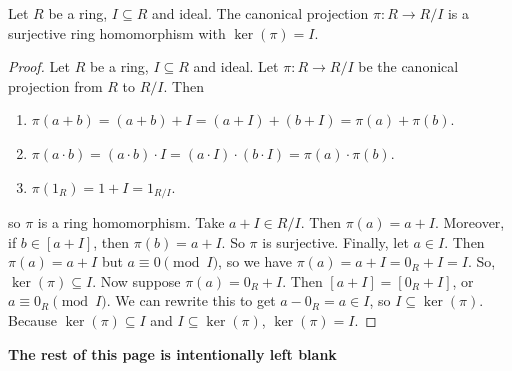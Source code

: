 \documentclass [12pt] {article}
\newenvironment{theorem}[1]{\begin{tcolorbox}[title={Theorem #1},colback=green!5!white,colframe=black!75!green]}{\end{tcolorbox}}
\renewcommand{\bf}[1]{\textbf{{#1}}}
\begin{document}
\newpage
\begin{theorem}{}
    Let $R$ be a ring, $I \subseteq R$ and ideal. The canonical projection $\pi : R \to R/I$ is a
    surjective ring homomorphism with $\ker(\pi) = I$.
\end{theorem}
\begin{proof}
    Let $R$ be a ring, $I \subseteq R$ and ideal. Let $\pi : R \to R/I$ be the canonical projection
    from $R$ to $R/I$. Then
    \begin{enumerate}[label=(\arabic*)]
        \item $\pi(a + b) = (a + b) + I = (a + I) + (b + I) = \pi(a) + \pi(b)$.
        \item $\pi(a \cdot b) = (a \cdot b) \cdot I = (a \cdot I) \cdot (b \cdot I) = \pi(a) \cdot \pi(b)$.
        \item $\pi(1_R) = 1 + I = 1_{R/I}$.
    \end{enumerate}
    so $\pi$ is a ring homomorphism. Take $a + I \in R/I$. Then $\pi(a) = a + I$. Moreover, if
    $b \in [a + I]$, then $\pi(b) = a + I$. So $\pi$ is surjective. Finally, let $a \in I$. Then
    $\pi(a) = a + I$ but $a \equiv 0 \pmod{I}$, so we have $\pi(a) = a + I = 0_R + I = I$. So,
    $\ker(\pi) \subseteq I$. Now suppose $\pi(a) = 0_R + I$. Then $[a + I] = [0_R + I]$,
    or $a \equiv 0_R \pmod{I}$. We can rewrite this to get $a - 0_R = a \in I$, so
    $I \subseteq \ker(\pi)$. Because $\ker(\pi) \subseteq I$ and $I \subseteq \ker(\pi)$,
    $\ker(\pi) = I$.
\end{proof}

\begin{center}
    \vspace{5em}
    \bf{The rest of this page is intentionally left blank}
\end{center}
\end{document}
